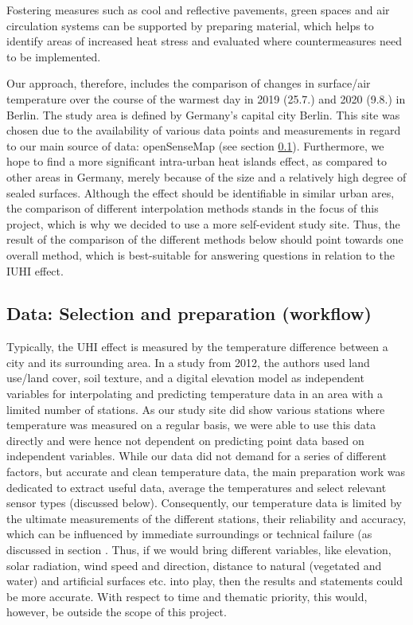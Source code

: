 Fostering measures such as cool and reflective pavements, green spaces and air circulation systems
can be supported by preparing material, which helps to identify areas of increased heat stress and evaluated where countermeasures need to be implemented.

Our approach, therefore, includes the comparison of changes in surface/air temperature over the course of the warmest day in 2019 (25.7.) and 2020 (9.8.) in Berlin. The study area is defined by Germany’s capital city Berlin. This site was chosen due to the availability of various data points and measurements in regard to our main source of data: openSenseMap (see section \ref{sec:data}). Furthermore, we hope to find a more significant intra-urban heat islands effect, as compared to other areas in Germany, merely because of the size and a relatively high degree of sealed surfaces.
Although the effect should be identifiable in similar urban ares, the comparison of different interpolation methods stands in the focus of this project, which is why we decided to use a more self-evident study site. Thus, the result of the comparison of the different methods below should point towards one overall method, which is best-suitable for answering questions in relation to the IUHI effect. 

\subsection{Data: Selection and preparation (workflow)}
\label{sec:data}

Typically, the UHI effect is measured by the temperature difference between a city and its surrounding area.\cite{us_epa_learn_2014} In a study from 2012, the authors used land use/land cover, soil texture, and a digital elevation model as independent variables for interpolating and predicting temperature data in an area with a limited number of stations.\cite{samanta_interpolation_2012} As our study site did show various stations where temperature was measured on a regular basis, we were able to use this data directly and were hence not dependent on predicting point data based on independent variables. While our data did not demand for a series of different factors, but accurate and \ldq{}clean\rdq{} temperature data, the main preparation work was dedicated to extract useful data, average the temperatures and select relevant sensor types (discussed below). Consequently, our temperature data is limited by the ultimate measurements of the different stations, their reliability and accuracy, which can be influenced by immediate surroundings or technical failure (as discussed in section
. Thus, if we would bring different variables, like elevation, solar radiation, wind speed and direction, distance to natural (vegetated and water) and artificial surfaces etc. into play, then the results and statements could be more accurate. With respect to time and thematic priority, this would, however, be outside the scope of this project.

